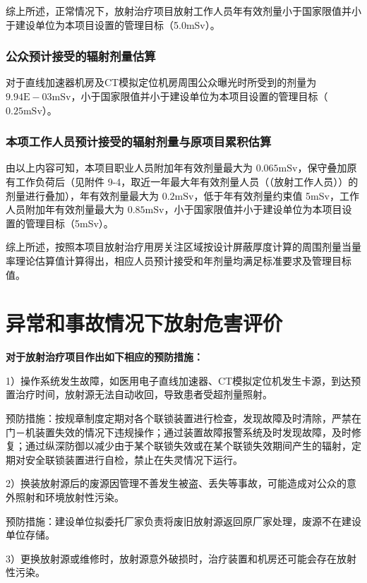 综上所述，正常情况下，放射治疗项目放射工作人员年有效剂量小于国家限值并小于建设单位为本项目设置的管理目标（5.0mSv）。

\subsubsection{公众预计接受的辐射剂量估算}

对于直线加速器机房及CT模拟定位机房周围公众曝光时所受到的剂量为 $9 . 9 4 \mathrm { E } { - } 0 3 \mathrm { m S v }$，小于国家限值并小于建设单位为本项目设置的管理目标（ $0 . 2 5 \mathrm { m S v }$）。

\subsubsection{本项工作人员预计接受的辐射剂量与原项目累积估算}

由以上内容可知，本项目职业人员附加年有效剂量最大为 $0 . 0 6 5 \mathrm { m S v }$，保守叠加原有工作负荷后（见附件 9-4，取近一年最大年有效剂量人员（（放射工作人员））的剂量进行叠加），年有效剂量最大为 $0 . 2 \mathrm { m S v }$，低于年有效剂量约束值 5mSv，工作人员附加年有效剂量最大为 $0 . 8 5 \mathrm { m S v }$，小于国家限值并小于建设单位为本项目设置的管理目标（5mSv）。

综上所述，按照本项目放射治疗用房关注区域按设计屏蔽厚度计算的周围剂量当量率理论估算值计算得出，相应人员预计接受和年剂量均满足标准要求及管理目标值。

\section{异常和事故情况下放射危害评价}

\textbf{对于放射治疗项目作出如下相应的预防措施：}

1）操作系统发生故障，如医用电子直线加速器、CT模拟定位机发生卡源，到达预置治疗时间，放射源无法自动收回，导致患者受超剂量照射。

预防措施：按规章制度定期对各个联锁装置进行检查，发现故障及时清除，严禁在门－机装置失效的情况下违规操作；通过装置故障报警系统及时发现故障，及时修复；通过纵深防御以减少由于某个联锁失效或在某个联锁失效期间产生的辐射，定期对安全联锁装置进行自检，禁止在失灵情况下运行。

2）换装放射源后的废源因管理不善发生被盗、丢失等事故，可能造成对公众的意外照射和环境放射性污染。

预防措施：建设单位拟委托厂家负责将废旧放射源返回原厂家处理，废源不在建设单位存储。

3）更换放射源或维修时，放射源意外破损时，治疗装置和机房还可能会存在放射性污染。

